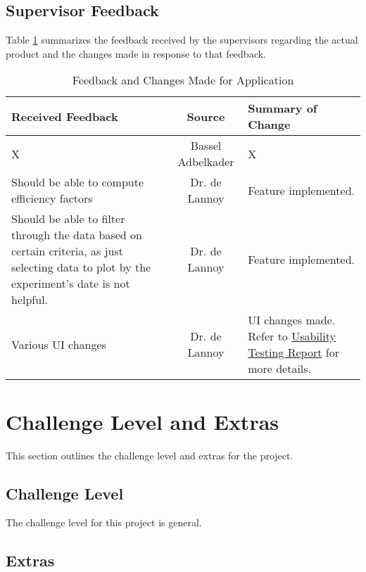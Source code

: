 \documentclass{article}
\begin{document}
\subsection{Supervisor Feedback}
Table \ref{table:Code} summarizes the feedback received by the supervisors
regarding the actual product and the changes made in response to that feedback.
\begin{table}[H]
\centering
\begin{tabularx}{\textwidth}{|X|c|X|}
    \hline
    \textbf{Received Feedback} & \textbf{Source} & \textbf{Summary of Change} \\
    \hline
    X & Bassel Adbelkader & X \\
    \hline
    Should be able to compute efficiency factors & Dr. de Lannoy & Feature
    implemented. \\
    \hline
    Should be able to filter through the data based on certain criteria, as just
    selecting data to plot by the experiment's date is not helpful. & Dr. de
    Lannoy & Feature implemented. \\
    \hline
    Various UI changes & Dr. de Lannoy & UI changes made. Refer to
    \href{https://github.com/SumanyaG/Alkalytics/blob/main/docs/UsabilityTestingReport/UsabilityTestingReport.pdf}{Usability
    Testing Report} for more details. \\
    \hline
\end{tabularx}
\caption{Feedback and Changes Made for Application}
\label{table:Code}
\end{table}

\section{Challenge Level and Extras}
This section outlines the challenge level and extras for the project.

\subsection{Challenge Level}

The challenge level for this project is general.

\subsection{Extras}
\end{document}

